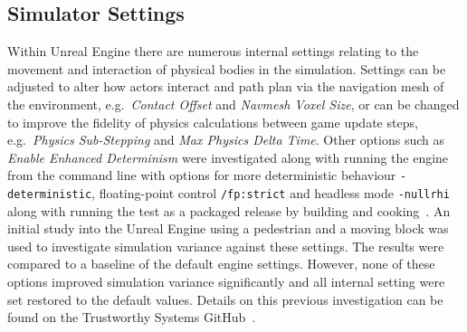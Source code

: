 \documentclass[letterpaper, 10 pt, journal, twoside]{IEEEtran}
\begin{document}




\subsection{Simulator Settings}

Within Unreal Engine there are numerous internal settings relating to the movement and interaction of physical bodies in the simulation. Settings can be adjusted to alter how actors interact and path plan via the navigation mesh of the environment, e.g.\ \textit{Contact Offset} and \textit{Navmesh Voxel Size}, or can be changed to improve the fidelity of physics calculations between game update steps, e.g.\ \textit{Physics Sub-Stepping} and \textit{Max Physics Delta Time}. Other options such as \textit{Enable Enhanced Determinism} were investigated along with running the engine from the command line with options for more deterministic behaviour \texttt{-deterministic}, floating-point control \texttt{/fp:strict} and headless mode \texttt{-nullrhi} along with running the test as a packaged release by building and cooking~\cite{releasing_project}.
An initial study into the Unreal Engine using a pedestrian and a moving block was used to investigate simulation variance against these settings. The results were compared to a baseline of the default engine settings. 
%
However, none of these options improved simulation variance significantly and all internal setting were set restored to the default values. Details on this previous investigation can be found on the Trustworthy Systems GitHub~\cite{TSLUnrealEngineTesting}. 
\end{document}
